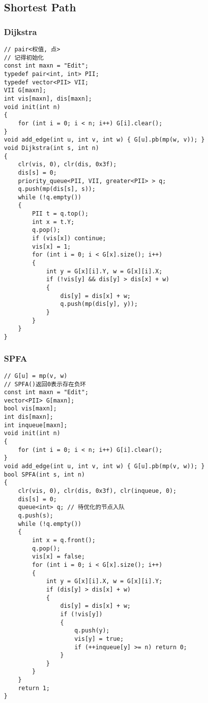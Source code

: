 \documentclass[twoside]{article}
\begin{document}
\subsection{Shortest Path}
\subsubsection{Dijkstra}
\begin{lstlisting}
// pair<权值, 点>
// 记得初始化
const int maxn = "Edit";
typedef pair<int, int> PII;
typedef vector<PII> VII;
VII G[maxn];
int vis[maxn], dis[maxn];
void init(int n)
{
    for (int i = 0; i < n; i++) G[i].clear();
}
void add_edge(int u, int v, int w) { G[u].pb(mp(w, v)); }
void Dijkstra(int s, int n)
{
    clr(vis, 0), clr(dis, 0x3f);
    dis[s] = 0;
    priority_queue<PII, VII, greater<PII> > q;
    q.push(mp(dis[s], s));
    while (!q.empty())
    {
        PII t = q.top();
        int x = t.Y;
        q.pop();
        if (vis[x]) continue;
        vis[x] = 1;
        for (int i = 0; i < G[x].size(); i++)
        {
            int y = G[x][i].Y, w = G[x][i].X;
            if (!vis[y] && dis[y] > dis[x] + w)
            {
                dis[y] = dis[x] + w;
                q.push(mp(dis[y], y));
            }
        }
    }
}
\end{lstlisting}
\subsubsection{SPFA}
\begin{lstlisting}
// G[u] = mp(v, w)
// SPFA()返回0表示存在负环
const int maxn = "Edit";
vector<PII> G[maxn];
bool vis[maxn];
int dis[maxn];
int inqueue[maxn];
void init(int n)
{
    for (int i = 0; i < n; i++) G[i].clear();
}
void add_edge(int u, int v, int w) { G[u].pb(mp(v, w)); }
bool SPFA(int s, int n)
{
    clr(vis, 0), clr(dis, 0x3f), clr(inqueue, 0);
    dis[s] = 0;
    queue<int> q; // 待优化的节点入队
    q.push(s);
    while (!q.empty())
    {
        int x = q.front();
        q.pop();
        vis[x] = false;
        for (int i = 0; i < G[x].size(); i++)
        {
            int y = G[x][i].X, w = G[x][i].Y;
            if (dis[y] > dis[x] + w)
            {
                dis[y] = dis[x] + w;
                if (!vis[y])
                {
                    q.push(y);
                    vis[y] = true;
                    if (++inqueue[y] >= n) return 0;
                }
            }
        }
    }
    return 1;
}
\end{lstlisting}
\end{document}
